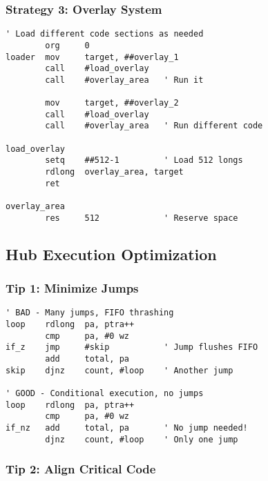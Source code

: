 \documentclass[11pt]{book}
\begin{document}
\hypertarget{strategy-3-overlay-system}{%
\subsubsection{Strategy 3: Overlay
System}\label{strategy-3-overlay-system}}

\begin{lstlisting}
' Load different code sections as needed
        org     0
loader  mov     target, ##overlay_1
        call    #load_overlay
        call    #overlay_area   ' Run it
        
        mov     target, ##overlay_2
        call    #load_overlay
        call    #overlay_area   ' Run different code
        
load_overlay
        setq    ##512-1         ' Load 512 longs
        rdlong  overlay_area, target
        ret
        
overlay_area
        res     512             ' Reserve space
\end{lstlisting}

\hypertarget{hub-execution-optimization}{%
\subsection{Hub Execution
Optimization}\label{hub-execution-optimization}}

\hypertarget{tip-1-minimize-jumps}{%
\subsubsection{Tip 1: Minimize Jumps}\label{tip-1-minimize-jumps}}

\begin{lstlisting}
' BAD - Many jumps, FIFO thrashing
loop    rdlong  pa, ptra++
        cmp     pa, #0 wz
if_z    jmp     #skip           ' Jump flushes FIFO
        add     total, pa
skip    djnz    count, #loop    ' Another jump
        
' GOOD - Conditional execution, no jumps
loop    rdlong  pa, ptra++
        cmp     pa, #0 wz
if_nz   add     total, pa       ' No jump needed!
        djnz    count, #loop    ' Only one jump
\end{lstlisting}

\hypertarget{tip-2-align-critical-code}{%
\subsubsection{Tip 2: Align Critical
Code}\label{tip-2-align-critical-code}}
\end{document}

